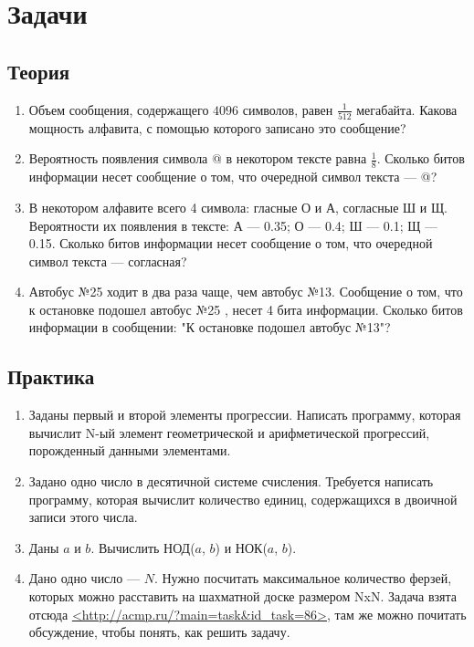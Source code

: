 \documentclass[12pt]{article}
\begin{document}
\section{Задачи}
\subsection{Теория}
\begin{enumerate}
\item Объем сообщения, содержащего $4096$ символов, равен $\frac{1}{512}$ мегабайта. Какова мощность алфавита, с помощью которого записано это сообщение?
\item Вероятность появления символа @ в некотором тексте равна $\frac{1}{8}$. Сколько битов информации несет сообщение о том, что очередной символ текста --- @?
\item В некотором алфавите всего 4 символа: гласные О и А, согласные Ш и Щ. Вероятности их появления в тексте: А --- 0.35; О --- 0.4; Ш --- 0.1; Щ --- 0.15. Сколько битов информации несет сообщение о том, что очередной символ текста --- согласная? 
\item Автобус №25 ходит в два раза чаще, чем автобус №13. Сообщение о том, что к остановке подошел автобус №25 , несет 4 бита информации. Сколько битов информации в сообщении: "К остановке подошел автобус №13"?
\end{enumerate}

\subsection{Практика}
\begin{enumerate}
\item Заданы первый и второй элементы прогрессии. Написать программу, которая вычислит N-ый элемент геометрической и арифметической прогрессий, порожденный данными элементами.
\item Задано одно число в десятичной системе счисления. Требуется написать программу, которая вычислит количество единиц, содержащихся в двоичной записи этого числа.
\item Даны $a$ и $b$. Вычислить НОД($a$, $b$) и НОК($a$, $b$).
\item Дано одно число --- $N$. Нужно посчитать максимальное количество ферзей, которых можно расставить на шахматной доске размером NxN. Задача взята отсюда \url{<http://acmp.ru/?main=task&id_task=86>}, там же можно почитать обсуждение, чтобы понять, как решить задачу.


\end{enumerate}
\end{document}
